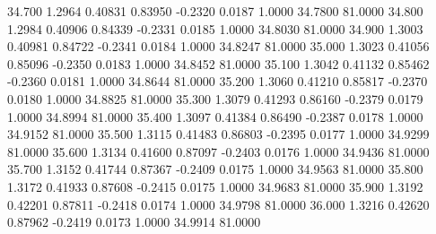   34.700   1.2964   0.40831   0.83950  -0.2320   0.0187   1.0000  34.7800  81.0000
  34.800   1.2984   0.40906   0.84339  -0.2331   0.0185   1.0000  34.8030  81.0000
  34.900   1.3003   0.40981   0.84722  -0.2341   0.0184   1.0000  34.8247  81.0000
  35.000   1.3023   0.41056   0.85096  -0.2350   0.0183   1.0000  34.8452  81.0000
  35.100   1.3042   0.41132   0.85462  -0.2360   0.0181   1.0000  34.8644  81.0000
  35.200   1.3060   0.41210   0.85817  -0.2370   0.0180   1.0000  34.8825  81.0000
  35.300   1.3079   0.41293   0.86160  -0.2379   0.0179   1.0000  34.8994  81.0000
  35.400   1.3097   0.41384   0.86490  -0.2387   0.0178   1.0000  34.9152  81.0000
  35.500   1.3115   0.41483   0.86803  -0.2395   0.0177   1.0000  34.9299  81.0000
  35.600   1.3134   0.41600   0.87097  -0.2403   0.0176   1.0000  34.9436  81.0000
  35.700   1.3152   0.41744   0.87367  -0.2409   0.0175   1.0000  34.9563  81.0000
  35.800   1.3172   0.41933   0.87608  -0.2415   0.0175   1.0000  34.9683  81.0000
  35.900   1.3192   0.42201   0.87811  -0.2418   0.0174   1.0000  34.9798  81.0000
  36.000   1.3216   0.42620   0.87962  -0.2419   0.0173   1.0000  34.9914  81.0000
